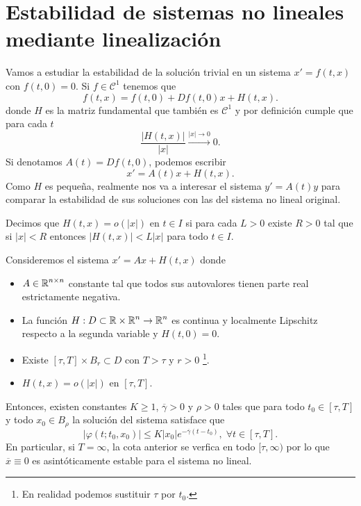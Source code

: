\chapter{Estabilidad de sistemas no lineales mediante linealización}
Vamos a estudiar la estabilidad de la solución trivial en un sistema $\displaystyle x' = f\left(t,x\right) $ con $\displaystyle f\left(t,0\right)=0 $. Si $\displaystyle f \in \mathcal{C}^{1} $ tenemos que 
\[f\left(t,x\right)=f\left(t,0\right) + Df\left(t,0\right)x + H\left(t,x\right) .\]
donde $\displaystyle H $ es la matriz fundamental que también es $\displaystyle \mathcal{C}^{1} $ y por definición cumple que para cada $\displaystyle t $
\[ \frac{ \left|H\left(t,x\right)\right|}{ \left|x\right|} \xrightarrow{ \left|x\right|\to 0}0 .\]
Si denotamos $\displaystyle A\left(t\right)=Df\left(t,0\right) $, podemos escribir
\[x' = A\left(t\right)x + H\left(t,x\right) .\]
Como $\displaystyle H $ es pequeña, realmente nos va a interesar el sistema $\displaystyle y' = A\left(t\right)y $ para comparar la estabilidad de sus soluciones con las del sistema no lineal original.
\begin{notation}
Decimos que $\displaystyle H\left(t,x\right)=o\left( \left|x\right|\right) $ en $\displaystyle t \in I $ si para cada $\displaystyle L > 0 $ existe $\displaystyle R > 0 $ tal que si $\displaystyle \left|x\right| < R $ entonces $\displaystyle \left|H\left(t,x\right)\right|< L \left|x\right| $ para todo $\displaystyle t \in I $. 
\end{notation}
\begin{theorem}
	Consideremos el sistema $\displaystyle x' = Ax + H\left(t,x\right) $ donde
	\begin{itemize}
	\item $\displaystyle A \in \mathbb{R}^{n\times n} $ constante tal que todos sus autovalores tienen parte real estrictamente negativa.
	\item La función $\displaystyle H : D \subset \mathbb{R} \times \mathbb{R}^{n}\to \mathbb{R}^{n} $ es continua y localmente Lipschitz respecto a la segunda variable y $\displaystyle H\left(t,0\right)=0 $.
	\item Existe $\displaystyle \left[\tau, T\right] \times B_{r}\subset D $ con $\displaystyle T > \tau $ y $\displaystyle r > 0 $ \footnote{En realidad podemos sustituir $\displaystyle \tau $ por $\displaystyle t_{0} $.}.
	\item $\displaystyle H\left(t,x\right)=o\left( \left|x\right|\right) $ en $\displaystyle [\tau, T] $. 
	\end{itemize}  
	Entonces, existen constantes $\displaystyle K \geq 1 $, $\displaystyle \overline{\gamma }>0 $ y $\displaystyle \rho > 0 $ tales que para todo $\displaystyle t_{0}\in [\tau, T] $ y todo $\displaystyle x_{0}\in B_{\rho} $ la solución del sistema satisface que 
	\[ \left|\varphi\left(t; t_{0}, x_{0}\right)\right| \leq K \left|x_{0}\right|e^{-\overline{\gamma }\left(t-t_{0}\right)}, \; \forall t \in [\tau, T] .\]
	En particular, si $\displaystyle T = \infty $, la cota anterior se verfica en todo $\displaystyle [\tau, \infty) $ por lo que $\displaystyle \overline{x}\equiv 0 $ es asintóticamente estable para el sistema no lineal. 
\end{theorem}
